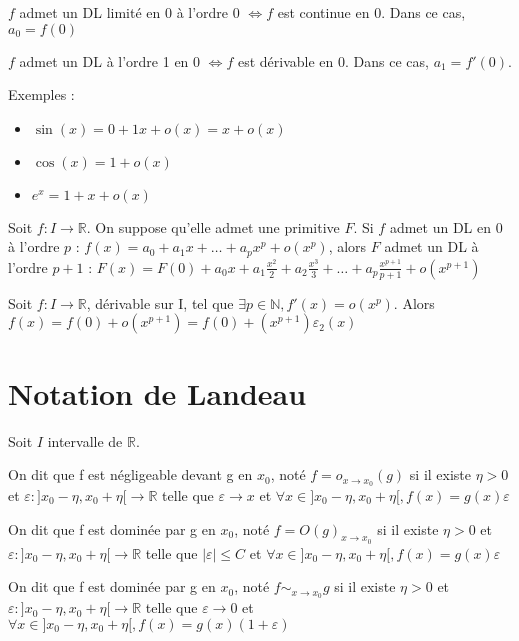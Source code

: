 \documentclass[french]{yLectureNote}
\newcommand{\N}[0]{\mathbb{N}}
\newcommand{\R}[0]{\mathbb{R}}
\begin{document}
\begin{lemma}
\(f\) admet un DL limité en 0 à l'ordre 0 \(\iff f\) est continue en 0. Dans ce cas, \(a_0 = f(0)\)
\end{lemma}
\begin{lemma}
\(f\) admet un DL à l'ordre 1 en 0 \(\iff f\) est dérivable en 0. Dans ce cas, \(a_1 = f'(0)\).
\end{lemma}
Exemples :\begin{itemize}
           \item  \(\sin(x) = 0 + 1x + o(x) = x+o(x)\)
           \item \(\cos(x) = 1+o(x)\)
           \item \(e^x = 1+x+o(x)\)
          \end{itemize}
\begin{proposition}[DL et ``primitivation'']
Soit \(f : I\to \R\). On suppose qu'elle admet une primitive \(F\). Si \(f\) admet un DL en 0 à l'ordre \(p\) : \(f(x) = a_0+a_1x+\dots+a_px^p+o(x^p)\), alors \(F\) admet un DL à l'ordre \(p+1\) : \(F(x) = F(0) + a_0x+a_1\frac{x^2}{2}+a_2\frac{x^3}{3}+\dots+a_p\frac{x^{p+1}}{p+1}+o(x^{p+1})\)
\end{proposition}
\begin{proposition}
Soit \(f : I\to \R\), dérivable sur I, tel que \(\exists p\in\N, f'(x) = o(x^p)\). Alors \(f(x) = f(0) + o(x^{p+1}) = f(0) + (x^{p+1})\varepsilon_2(x)\)
\end{proposition}
\section{Notation de Landeau}
\begin{definition}
Soit \(I\) intervalle de \(\mathbb{R}\).

On dit que f est négligeable devant g en \(x_0\), noté \(f= o_{x\to x_0}(g)\) si il existe \(\eta >0\) et \(\varepsilon : ]x_0-\eta,x_0+\eta[\to \R\) telle que \(\varepsilon \to x\) et \(\forall x\in]x_0-\eta,x_0+\eta[, f(x) = g(x)\varepsilon\)

On dit que f est dominée par g en \(x_0\), noté \(f = O(g)_{x\to x_0}\)  si il existe \(\eta >0\) et \(\varepsilon : ]x_0-\eta,x_0+\eta[\to \R\) telle que \(|\varepsilon| \leq C\) et \(\forall x\in]x_0-\eta,x_0+\eta[, f(x) = g(x)\varepsilon\)

On dit que f est dominée par g en \(x_0\), noté \(f \sim_{x\to x_0} g\)  si il existe \(\eta >0\) et \(\varepsilon : ]x_0-\eta,x_0+\eta[\to \R\) telle que \(\varepsilon \to 0\) et \(\forall x\in]x_0-\eta,x_0+\eta[, f(x) = g(x)(1+\varepsilon)\)
\end{definition}
\end{document}
